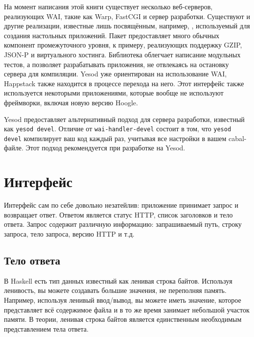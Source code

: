 На момент написания этой книги существует несколько веб-серверов, реализующих
WAI, такие как Warp, FastCGI и сервер разработки. Существуют и другие
реализации, известные лишь посвящённым, например,
,
используемый для создания настольных приложений. Пакет
предоставляет много обычных компонент промежуточного уровня, к примеру,
реализующих поддержку GZIP, JSON-P и виртуального хостинга. Библиотека
 облегчает
написание модульных тестов, а
позволяет разрабатывать приложения, не отвлекаясь на остановку сервера для
компиляции.  Yesod уже ориентирован на использование WAI, Happstack также
находится в процессе перехода на него.  Этот интерфейс также используется
некоторыми приложениями, которые вообще не используют фреймворки, включая новую
версию Hoogle.

\begin{remark}
    Yesod предоставляет альтернативный подход для сервера разработки, известный
    как \texttt{yesod devel}. Отличие от \texttt{wai-handler-devel} состоит в
    том, что \texttt{yesod devel} компилирует ваш код каждый раз, учитывая все
    настройки в вашем cabal-файле.  Этот подход рекомендуется при разработке на
    Yesod.
\end{remark}

\section {Интерфейс}
Интерфейс сам по себе довольно незатейлив: приложение принимает запрос и
возвращает ответ. Ответом является статус HTTP, список заголовков и тело
ответа.  Запрос содержит различную информацию: запрашиваемый путь, строку
запроса, тело запроса, версию HTTP и т.д.

\subsection {Тело ответа}
В Haskell есть тип данных известный как ленивая строка байтов. Используя
ленивость, вы можете создавать большие значения, не переполняя память.
Например, используя ленивый ввод/вывод, вы можете иметь значение, которое
представляет всё содержимое файла и в то же время занимает небольшой участок
памяти. В теории, ленивая строка байтов является единственным необходимым
представлением тела ответа.

